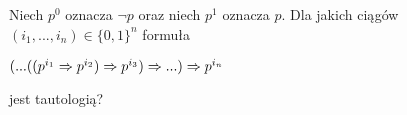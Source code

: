Niech $p^0$ oznacza ${\neg}p$ oraz niech $p^1$ oznacza $p$. Dla jakich ciągów
\n
$(i_1, ... , i_n) \in \{0, 1\}^n$ formuła

\begin{center}
$(... ((p^{i_1} \Rightarrow p^{i_2}) \Rightarrow p^{i_3}) \Rightarrow ...) \Rightarrow p^{i_n}$
\end{center}
\noindent
jest tautologią?